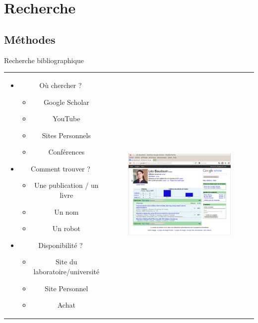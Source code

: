 \documentclass{beamer}
\begin{document}

\section{Recherche}
\subsection*{Méthodes}

\begin{frame}{Recherche bibliographique}
\begin{tabular}{c c}
\begin{minipage}{0.6\linewidth}
  \begin{itemize}
  \item Où chercher ?
  \begin{itemize}
  \item Google Scholar
  \item YouTube 
  \item Sites Personnels
  \item Conférences
  \end{itemize}
  \item Comment trouver ?
  \begin{itemize}
  \item Une publication / un livre
  \item Un nom
  \item Un robot
  \end{itemize}
  \item Disponibilité ?
  \begin{itemize}
  \item Site du laboratoire/université
  \item Site Personnel
  \item Achat
  \end{itemize}
  \end{itemize}
  \end{minipage}
  &
  \begin{minipage}{0.4\linewidth}
  \begin{figure}
  \includegraphics[width=0.9\linewidth]{images/GoogleScholar.png}

\end{figure}
\end{minipage}
\end{tabular}
\end{frame}
\end{document}

